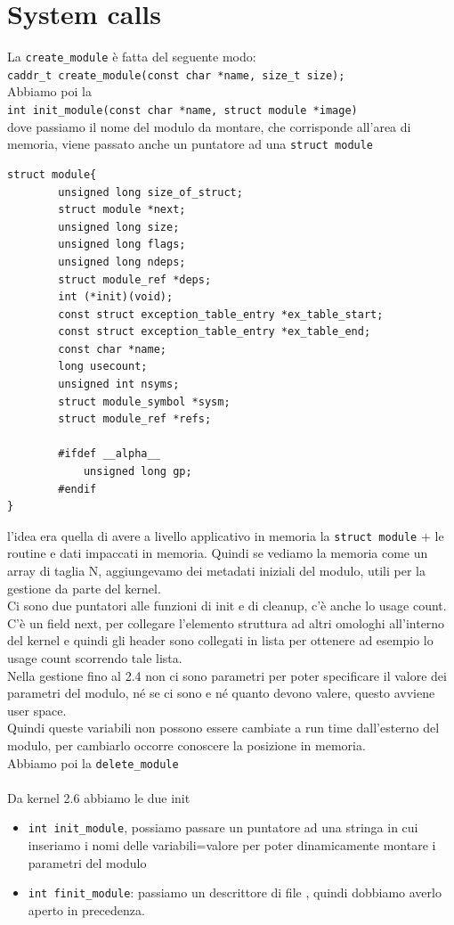 \documentclass[12pt, oneside]{extbook}
\begin{document}
\section{System calls}
La \texttt{create\_module} è fatta del seguente modo:\\
\texttt{caddr\_t create\_module(const char *name, size\_t size);}
\\Abbiamo poi la\\
\texttt{int init\_module(const char *name, struct module *image)}\\dove passiamo il nome del modulo da montare, che corrisponde all'area di memoria, viene passato anche un puntatore ad una \texttt{struct module}
\begin{lstlisting}
struct module{
		unsigned long size_of_struct;
		struct module *next;
		unsigned long size;
		unsigned long flags;
		unsigned long ndeps;
		struct module_ref *deps;
		int (*init)(void);
		const struct exception_table_entry *ex_table_start;
		const struct exception_table_entry *ex_table_end;
		const char *name;
		long usecount;
		unsigned int nsyms;
		struct module_symbol *sysm;
		struct module_ref *refs;
		
		#ifdef __alpha__
			unsigned long gp;
		#endif
}
\end{lstlisting}
l'idea era quella di avere a livello applicativo in memoria la \texttt{struct module} + le routine e dati impaccati in memoria. Quindi se vediamo la memoria come un array di taglia N, aggiungevamo dei metadati iniziali del modulo, utili per la gestione da parte del kernel.\\Ci sono due puntatori alle funzioni di init e di cleanup, c'è  anche lo usage count. C'è un field next, per collegare l'elemento struttura ad altri omologhi all'interno del kernel e quindi gli header sono collegati in lista per ottenere ad esempio lo usage count scorrendo tale lista.\\Nella gestione fino al 2.4 non ci sono parametri per poter specificare il valore dei parametri del modulo, né se ci sono e né quanto devono valere, questo avviene user space.\\ Quindi queste variabili non possono essere cambiate a run time dall'esterno del modulo, per cambiarlo occorre conoscere la posizione in memoria.\\Abbiamo poi la \texttt{delete\_module}\\\\Da kernel 2.6 abbiamo le due init
\begin{itemize}
\item \texttt{int init\_module}, possiamo passare un puntatore ad una stringa in cui inseriamo i nomi delle variabili=valore per poter dinamicamente montare i parametri del modulo
\item \texttt{int finit\_module}: passiamo un descrittore di file , quindi dobbiamo averlo aperto in precedenza.
\end{itemize}
\end{document}
